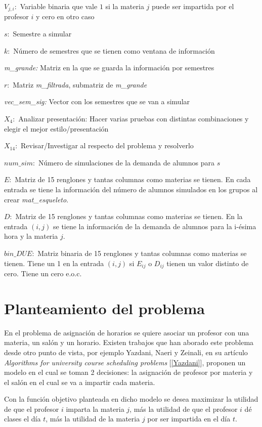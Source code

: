 $V_{j,i}:$ Variable binaria que vale $1$ si la materia $j$ puede ser impartida por  el profesor $i$ y cero en otro caso

$s:$ Semestre a simular

$k:$ Número de semestres que se tienen como ventana de información

\textit{m\_grande:} Matriz en la que se guarda la información por semestres

$r:$ Matriz \textit{m\_filtrada}, submatriz de \textit{m\_grande}

\textit{vec\_sem\_sig:} Vector con los semestres que se van a simular

$X_{4}:$ Analizar presentación: Hacer varias pruebas con distintas combinaciones y elegir el mejor estilo/presentación

$X_{14}:$ Revisar/Investigar al respecto del problema y resolverlo

$num\_sim:$ Número de simulaciones de la demanda de alumnos para $s$
  
  $E:$ Matriz de 15 renglones y tantas columnas como materias se tienen. En cada entrada se tiene la información del número de alumnos simulados en los grupos al crear \textit{mat\_esqueleto}.

$D:$ Matriz de 15 renglones y tantas columnas como materias se tienen. En la entrada $(i,j)$ se tiene la información de la demanda de alumnos para la i-ésima hora y la materia $j$.

$bin\_DUE:$ Matriz binaria de 15 renglones y tantas columnas como materias se tienen. Tiene un 1 en la entrada $(i,j)$ si $E_{ij}$ o $D_{ij}$ tienen un valor distinto de cero. Tiene un cero e.o.c.

  
  
  \section{Planteamiento del problema}

En el problema de asignación de horarios se quiere asociar un profesor con una materia, un salón y un horario. Existen trabajos que han aborado este problema desde otro punto de vista, por ejemplo Yazdani, Naeri y Zeinali, en su artículo \textit{Algorithms for university course scheduling problems} [\ref{Yazdani}], proponen un modelo en el cual se toman 2 decisiones: la asignación de profesor por materia y el salón en el cual se va a impartir cada materia.

Con la función objetivo planteada en dicho modelo se desea maximizar la utilidad de que el profesor $i$ imparta la materia $j$, más la utilidad de que el profesor $i$ dé clases el día $t$, más la utilidad de la materia $j$ por ser impartida en el día $t$.


